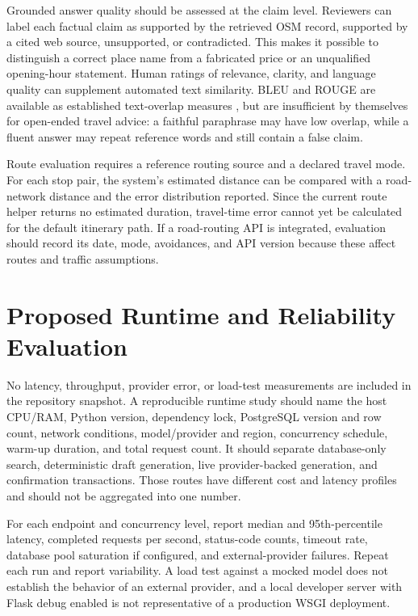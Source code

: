 Grounded answer quality should be assessed at the claim level. Reviewers can label each factual claim as supported by the retrieved OSM record, supported by a cited web source, unsupported, or contradicted. This makes it possible to distinguish a correct place name from a fabricated price or an unqualified opening-hour statement. Human ratings of relevance, clarity, and language quality can supplement automated text similarity. BLEU and ROUGE are available as established text-overlap measures \cite{papineni2002bleu,lin2004rouge}, but are insufficient by themselves for open-ended travel advice: a faithful paraphrase may have low overlap, while a fluent answer may repeat reference words and still contain a false claim.

Route evaluation requires a reference routing source and a declared travel mode. For each stop pair, the system's estimated distance can be compared with a road-network distance and the error distribution reported. Since the current route helper returns no estimated duration, travel-time error cannot yet be calculated for the default itinerary path. If a road-routing API is integrated, evaluation should record its date, mode, avoidances, and API version because these affect routes and traffic assumptions.

\section{Proposed Runtime and Reliability Evaluation}

No latency, throughput, provider error, or load-test measurements are included in the repository snapshot. A reproducible runtime study should name the host CPU/RAM, Python version, dependency lock, PostgreSQL version and row count, network conditions, model/provider and region, concurrency schedule, warm-up duration, and total request count. It should separate database-only search, deterministic draft generation, live provider-backed generation, and confirmation transactions. Those routes have different cost and latency profiles and should not be aggregated into one number.

For each endpoint and concurrency level, report median and 95th-percentile latency, completed requests per second, status-code counts, timeout rate, database pool saturation if configured, and external-provider failures. Repeat each run and report variability. A load test against a mocked model does not establish the behavior of an external provider, and a local developer server with Flask debug enabled is not representative of a production WSGI deployment.

